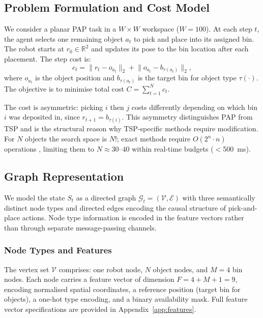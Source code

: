 \documentclass[conference]{IEEEtran}
\begin{document}
\subsection{Problem Formulation and Cost Model}

We consider a planar PAP task in a $W \times W$ workspace ($W=100$). At each step $t$, the agent selects one remaining object $a_t$ to pick and place into its assigned bin. The robot starts at $r_0 \in \mathbb{R}^2$ and updates its pose to the bin location after each placement. The step cost is:
\begin{equation}
c_t = \lVert r_t - o_{a_t} \rVert_2 + \lVert o_{a_t} - b_{\tau(a_t)} \rVert_2,
\end{equation}
where $o_{a_t}$ is the object position and $b_{\tau(a_t)}$ is the target bin for object type $\tau(\cdot)$. The objective is to minimise total cost $C = \sum_{t=1}^{N} c_t$.

The cost is asymmetric: picking $i$ then $j$ costs differently depending on which bin $i$ was deposited in, since $r_{t+1} = b_{\tau(i)}$. This asymmetry distinguishes PAP from TSP and is the structural reason why TSP-specific methods require modification. For $N$ objects the search space is $N!$; exact methods require $O(2^n \cdot n)$ operations \cite{han2019pap}, limiting them to $N \approx 30$--$40$ within real-time budgets ($<$500~ms).

\subsection{Graph Representation}

We model the state $S_t$ as a directed graph $\mathcal{G}_t = (\mathcal{V}, \mathcal{E})$ with three semantically distinct node types and directed edges encoding the causal structure of pick-and-place actions. Node type information is encoded in the feature vectors rather than through separate message-passing channels.

\subsubsection{Node Types and Features}
The vertex set $\mathcal{V}$ comprises: one robot node, $N$ object nodes, and $M{=}4$ bin nodes. Each node carries a feature vector of dimension $F = 4 + M + 1 = 9$, encoding normalised spatial coordinates, a reference position (target bin for objects), a one-hot type encoding, and a binary availability mask. Full feature vector specifications are provided in Appendix~\ref{app:features}.
\end{document}
